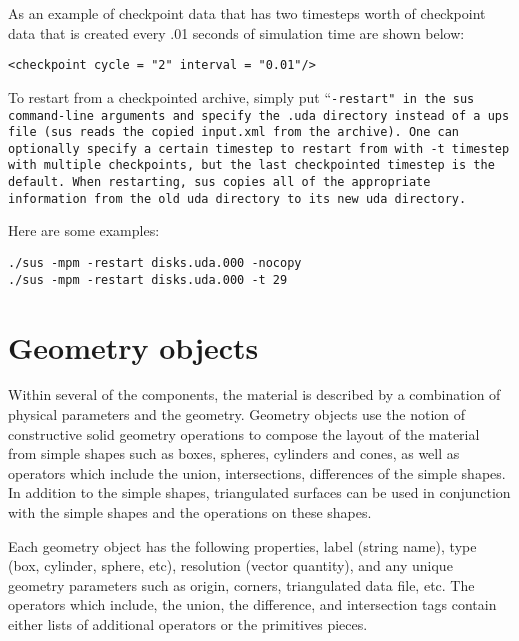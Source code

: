 As an example of checkpoint data that has two timesteps worth of
checkpoint data that is created every .01 seconds of simulation time
are shown below:

\begin{Verbatim}[fontsize=\footnotesize]
<checkpoint cycle = "2" interval = "0.01"/>
\end{Verbatim}

To restart from a checkpointed archive, simply put ``\tt -restart\normalfont" in the
sus command-line arguments and specify the .uda directory instead of
a ups file (sus reads the copied \tt input.xml \normalfont from the
archive).  One can optionally specify a certain timestep to restart
from with \tt -t timestep \normalfont with multiple checkpoints, but the
last checkpointed timestep is the default.  When restarting, sus
copies all of the appropriate information from the old uda directory to its
new uda directory.

Here are some examples:

\begin{Verbatim}[fontsize=\footnotesize]
./sus -mpm -restart disks.uda.000 -nocopy
./sus -mpm -restart disks.uda.000 -t 29
\end{Verbatim}
%
\section{Geometry objects} \label{Sec:GeometryObjects}

Within several of the components, the material is described by a
combination of physical parameters and the geometry.  Geometry objects
use the notion of constructive solid geometry operations to compose
the layout of the material from simple shapes such as boxes, spheres,
cylinders and cones, as well as operators which include the union,
intersections, differences of the simple shapes.  In addition to the
simple shapes, triangulated surfaces can be used in conjunction with
the simple shapes and the operations on these shapes.

Each geometry object has the following properties, label (string
name), type (box, cylinder, sphere, etc), resolution (vector
quantity), and any unique geometry parameters such as origin, corners,
triangulated data file, etc.  The operators which include, the union,
the difference, and intersection tags contain either lists of
additional operators or the primitives pieces.

